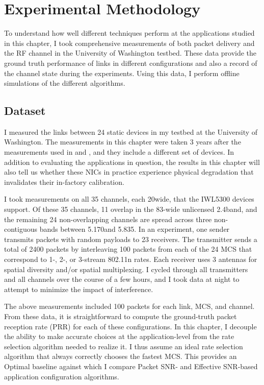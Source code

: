 \section{Experimental Methodology}
To understand how well different techniques perform at the applications studied in this chapter, I took comprehensive measurements of both packet delivery and the RF channel in the University of Washington testbed. These data provide the ground truth performance of links in different configurations and also a record of the channel state during the experiments. Using this data, I perform offline simulations of the different algorithms.

\subsection{Dataset}
I measured the links between 24 static devices in my testbed at the University of Washington. The measurements in this chapter were taken 3 years after the measurements used in  and , and they include a different set of devices. In addition to evaluating the applications in question, the results in this chapter will also tell us whether these NICs in practice experience physical degradation that invalidates their in-factory calibration.

I took measurements on all 35 channels, each 20\MHz wide, that the IWL5300 devices support. Of these 35 channels, 11 overlap in the 83\MHz-wide unlicensed 2.4\GHz band, and the remaining 24 non-overlapping channels are spread across three non-contiguous bands between 5.170\GHz and 5.835\GHz. In an experiment, one sender transmits packets with random payloads to 23 receivers. The transmitter sends a total of 2400 packets by interleaving 100 packets from each of the 24 MCS that correspond to 1-, 2-, or 3-stream 802.11n rates. Each receiver uses 3 antennas for spatial diversity and/or spatial multiplexing. I cycled through all transmitters and all channels over the course of a few hours, and I took data at night to attempt to minimize the impact of interference.

The above measurements included 100 packets for each link, MCS, and channel. From these data, it is straightforward to compute the ground-truth packet reception rate (PRR) for each of these configurations. In this chapter, I decouple the ability to make accurate choices at the application-level from the rate selection algorithm needed to realize it. I thus assume an ideal rate selection algorithm that always correctly chooses the fastest MCS. This provides an Optimal baseline against which I compare Packet SNR- and Effective SNR-based application configuration algorithms.

